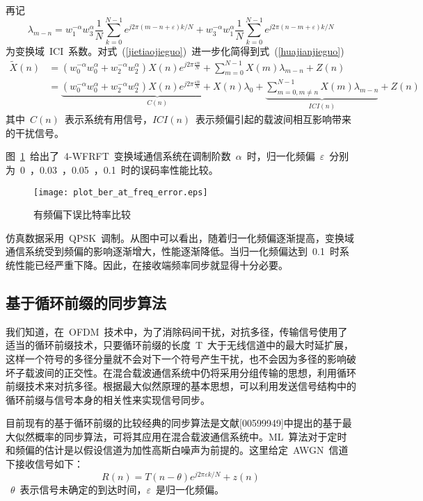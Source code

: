 再记
\begin{equation}
{\lambda _{m - n}} = w_1^{ - \alpha }w_3^\alpha \frac{1}{N}\sum\limits_{k = 0}^{N - 1} {{e^{j2\pi (m - n + \varepsilon )k/N}}}  + w_3^{ - \alpha }w_1^\alpha \frac{1}{N}\sum\limits_{k = 0}^{N - 1} {{e^{j2\pi (n - m + \varepsilon )k/N}}}
\end{equation}
为变换域~ICI~系数。对式~(\ref{jietiaojieguo})~进一步化简得到式~(\ref{huajianjieguo})~
\begin{align}\label{huajianjieguo}
\tilde X(n) &= (w_0^{ - \alpha }w_0^\alpha  + w_2^{ - \alpha }w_2^\alpha )X(n){e^{j2\pi \frac{{\varepsilon n}}{N}}} + \sum\limits_{m = 0}^{N - 1} {X(m){\lambda _{m - n}}}  + Z(n) \\
&= \underbrace {(w_0^{ - \alpha }w_0^\alpha  + w_2^{ - \alpha }w_2^\alpha )X(n){e^{j2\pi \frac{{\varepsilon n}}{N}}} + X(n){\lambda _0}}_{C(n)} + \underbrace {\sum\limits_{m = 0,m \ne n}^{N - 1} {X(m){\lambda _{m - n}}} }_{ICI(n)} + Z(n)
\end{align}
其中~$C(n)$~表示系统有用信号，$ICI(n)$~表示频偏引起的载波间相互影响带来的干扰信号。

图~\ref{plot_ber_at_freq_error}~给出了~4-WFRFT~变换域通信系统在调制阶数~$\alpha$~时，归一化频偏~$\varepsilon$~分别为~0~，0.03~，0.05~，0.1~时的误码率性能比较。
\begin{figure}[htbp]
\centering
\texttt{[image: plot\_ber\_at\_freq\_error.eps]}
\caption{有频偏下误比特率比较}\vspace{-1em}\label{plot_ber_at_freq_error}
\end{figure}
仿真数据采用~QPSK~调制。从图中可以看出，随着归一化频偏逐渐提高，变换域通信系统受到频偏的影响逐渐增大，性能逐渐降低。当归一化频偏达到~0.1~时系统性能已经严重下降。因此，在接收端频率同步就显得十分必要。


\subsection{基于循环前缀的同步算法}


我们知道，在~OFDM~技术中，为了消除码间干扰，对抗多径，传输信号使用了适当的循环前缀技术，只要循环前缀的长度~T~大于无线信道中的最大时延扩展，这样一个符号的多径分量就不会对下一个符号产生干扰，也不会因为多径的影响破坏子载波间的正交性。在混合载波通信系统中仍将采用分组传输的思想，利用循环前缀技术来对抗多径。根据最大似然原理的基本思想，可以利用发送信号结构中的循环前缀与信号本身的相关性来实现信号同步。

目前现有的基于循环前缀的比较经典的同步算法是文献[00599949]中提出的基于最大似然概率的同步算法，可将其应用在混合载波通信系统中。ML~算法对于定时和频偏的估计是以假设信道为加性高斯白噪声为前提的。这里给定~AWGN~信道下接收信号如下：
\begin{equation}
R(n) = T(n-\theta){e^{j2\pi \varepsilon k/N} } + z(n)
\end{equation}
~$\theta$~表示信号未确定的到达时间，$\varepsilon$~是归一化频偏。


